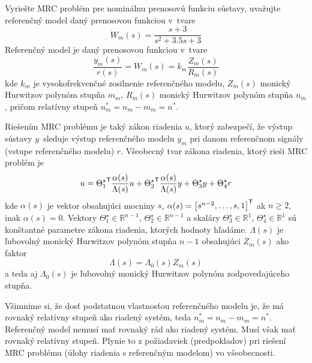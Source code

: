 \documentclass[a4paper, 10pt, ]{article}
\begin{document}
\smallskip

{\color{gray}

Vyriešte MRC problém pre nominálnu prenosovú funkciu sústavy, uvažujte referenčný model daný prenosovou funkciou v~tvare
\begin{equation*}
    W_m(s) = \frac{s + 3}{ s^2 + 3.5 s + 3}
\end{equation*}
Referenčný model je daný prenosovou funkciou v~tvare
\begin{equation*}
    \frac{y_m(s)}{r(s)} = W_m(s) = k_m \frac{Z_m(s)}{R_m(s)}
\end{equation*}
kde $k_m$ je vysokofrekvenčné zosilnenie referenčného modelu, $Z_m(s)$ monický Hurwitzov polynóm stupňa $m_m$, $R_m(s)$ monický Hurwitzov polynóm stupňa $n_m$, pričom relatívny stupeň $n^*_m = n_m - m_m = n^*$.

Riešením MRC problému je taký zákon riadenia $u$, ktorý zabezpečí, že výstup sústavy $y$~sleduje výstup referenčného modelu $y_m$ pri danom referenčnom signály (vstupe referenčného modelu) $r$. Všeobecný tvar zákona riadenia, ktorý rieši MRC problém je
\begin{equation*}
    u = {\Theta_1^\star}^{\mathsf{T}} \frac{\alpha(s)}{\Lambda(s)} u + {\Theta_2^\star}^{\mathsf{T}} \frac{\alpha(s)}{\Lambda(s)} y + \Theta_3^\star y + \Theta_4^\star r
\end{equation*}
kde $\alpha(s)$ je vektor obsahujúci mocniny $s$, $\alpha(s) = \begin{bmatrix} s^{n-2}, \ldots,s, 1 \end{bmatrix}^{\mathsf{T}}$ ak $n\geq 2$, inak $\alpha(s) = 0$. Vektory $\Theta_1^\star \in \mathbb{R}^{n-1}$, $\Theta_2^\star \in \mathbb{R}^{n-1}$ a skaláry $\Theta_3^\star \in \mathbb{R}^1$, $\Theta_4^\star \in \mathbb{R}^1$ sú konštantné parametre zákona riadenia, ktorých hodnoty hľadáme.  $\Lambda(s)$ je ľubovolný monický Hurwitzov polynóm stupňa $n-1$ obsahujúci $Z_m(s)$ ako faktor
\begin{equation*}
    \Lambda(s) = \Lambda_0(s) Z_m(s)
\end{equation*}
a teda aj $\Lambda_0(s)$ je ľubovolný monický Hurwitzov polynóm zodpovedajúceho stupňa.

}

\smallskip



Všimnime si, že dosť podstatnou vlastnosťou referenčného modelu je, že má rovnaký relatívny stupeň ako riadený systém, teda $n^*_m = n_m - m_m = n^*$. Referenčný model  nemusí mať rovnaký rád ako riadený systém. Musí však mať rovnaký relatívny stupeň. Plynie to z požiadaviek (predpokladov) pri riešení MRC problému (úlohy riadenia s referenčným modelom) vo všeobecnosti.
\end{document}
